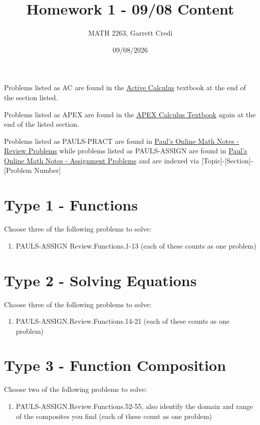 \documentclass[12pt]{article}
\title{Homework 1 - 09/08 Content}
\author{MATH 2263, Garrett Credi}
\date{09/08/2026}
\begin{document}
\maketitle

Problems listed as AC are found in the \href{https://activecalculus.org/single1e/frontmatter.html}{Active Calculus} 
textbook at the end of the section listed.

Problems listed as APEX are found in the \href{https://opentext.uleth.ca/apex-calculus/apex-calculus.html}{APEX Calculus Textbook}
again at the end of the listed section.

Problems listed as PAULS-PRACT are found in \href{https://tutorial.math.lamar.edu/Problems/CalcI/CalcI.aspx}{Paul's Online Math Notes - Review Problems}
while problems listed as PAULS-ASSIGN are found in \href{https://tutorial.math.lamar.edu/ProblemsNS/CalcI/CalcI.aspx}{Paul's Online Math Notes - Assignment Problems}
and are indexed via [Topic]-[Section]-[Problem Number]

\section{Type 1 - Functions}
Choose three of the following problems to solve:

\begin{enumerate}
  \item PAULS-ASSIGN Review.Functions.1-13 (each of these counts as one problem)
\end{enumerate}

\section{Type 2 - Solving Equations}
Choose three of the following problems to solve:
\begin{enumerate}
  \item PAULS-ASSIGN.Review.Functions.14-21 (each of these counts as one problem)
\end{enumerate}

\section{Type 3 - Function Composition}
Choose two of the following problems to solve:
\begin{enumerate}
  \item PAULS-ASSIGN.Review.Functions.52-55, also identify the domain and range of the composites you find (each of these count as one problem)
\end{enumerate}
\end{document}
